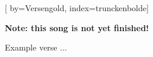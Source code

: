 
[%
    by={Versengold},
    index={trunckenbolde}]


    \label{trunckenbolde}

    \textbf{Note: this song is not yet finished!}

    \beginverse
        Example verse ...
    \endverse
\endsong
